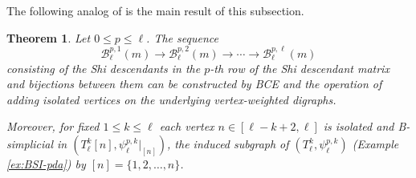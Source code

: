 \documentclass[11pt]{article}
\newtheorem{theorem}[theo]{Theorem}
\theoremstyle{definition}
\numberwithin{equation}{section}
\newcommand{\B}{\mathcal{B}}
\begin{document}
The following analog of \cite[Proposition 7.16]{MRT24} is the main result of this subsection.
\begin{theorem}
 \label{thm:BSI-seq}
Let  $0 \le p \le \ell$.
The sequence  
$$ \B^{p,1}_\ell(m) \longrightarrow \B^{p,2}_\ell(m)\longrightarrow \cdots\longrightarrow \B^{p,\ell}_\ell(m)$$
consisting of the Shi descendants in the $p$-th row of the Shi descendant matrix and bijections between them can be constructed by BCE and the operation of adding isolated vertices on the underlying vertex-weighted digraphs. 

Moreover, for fixed $1 \le k \le \ell$ each vertex $n \in [\ell-k+2, \ell] $ is isolated and B-simplicial in  $ (T_{\ell}^{k}[n], \psi_{\ell}^{p,k}|_{[n]})$, the induced subgraph of $(T_{\ell}^{k}, \psi_{\ell}^{p,k})$ (Example \ref{ex:BSI-pda}) by $[n]=\{1,2,\ldots,n\}$.
 \end{theorem} 
\end{document}
